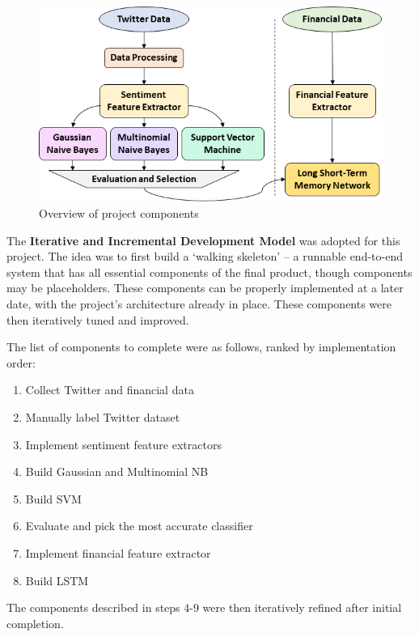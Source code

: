 \documentclass[12pt,a4paper,twoside,openright]{report}
\begin{document}
\begin{figure}[H]
\centering
\vspace{10pt}
\includegraphics[width=\textwidth]{Proj_Overview.png}
\caption{Overview of project components}
\label{fig:overview}
\end{figure}

The \textbf{Iterative and Incremental Development Model} was adopted for this project.
The idea was to first build a `walking skeleton' -- a runnable end-to-end system that
has all essential components of the final product, though components
may be placeholders\cite{Cockburn04}. These components can be properly
implemented at a later date, with the project's architecture already in place.
These components were then iteratively tuned and improved.

The list of components to complete were as follows, ranked by implementation order:

\begin{enumerate}
\item
Collect Twitter and financial data

\item
Manually label Twitter dataset

\item
Implement sentiment feature extractors

\item
Build Gaussian and Multinomial NB

\item
Build SVM

\item
Evaluate and pick the most accurate classifier

\item
Implement financial feature extractor

\item
Build LSTM
\end{enumerate}
The components described in steps 4-9 were then iteratively refined after initial completion.
\end{document}
